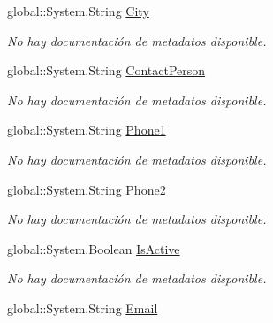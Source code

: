 \begin{DoxyCompactItemize}
global\-::\-System.\-String \hyperlink{class_game_memory_1_1_customers_adca84dbe266ae65ba70627ec94714276}{City}
\begin{DoxyCompactList}\small\item\em No hay documentación de metadatos disponible. \end{DoxyCompactList}\item 
global\-::\-System.\-String \hyperlink{class_game_memory_1_1_customers_a3d4d2e80ca8d609a215f4cfe037ccfc0}{Contact\-Person}
\begin{DoxyCompactList}\small\item\em No hay documentación de metadatos disponible. \end{DoxyCompactList}\item 
global\-::\-System.\-String \hyperlink{class_game_memory_1_1_customers_a0294fbd74c2ccc7636391ecde3a502a1}{Phone1}
\begin{DoxyCompactList}\small\item\em No hay documentación de metadatos disponible. \end{DoxyCompactList}\item 
global\-::\-System.\-String \hyperlink{class_game_memory_1_1_customers_a6ca17ada64734ee4d301d5bc701ca213}{Phone2}
\begin{DoxyCompactList}\small\item\em No hay documentación de metadatos disponible. \end{DoxyCompactList}\item 
global\-::\-System.\-Boolean \hyperlink{class_game_memory_1_1_customers_a24e171b530ecc8d281c609bb105e993f}{Is\-Active}
\begin{DoxyCompactList}\small\item\em No hay documentación de metadatos disponible. \end{DoxyCompactList}\item 
global\-::\-System.\-String \hyperlink{class_game_memory_1_1_customers_a37a6087319b6594adbec2b27b820d0ea}{Email}

\end{DoxyCompactItemize}
